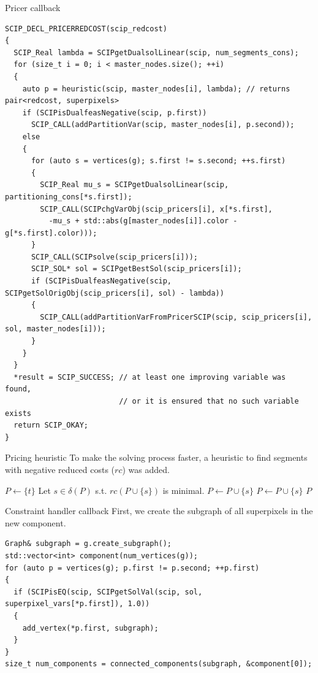 \documentclass[fleqn]{beamer}
\begin{document}
\begin{frame}[fragile]{Pricer callback}
\begin{verbatim}
SCIP_DECL_PRICERREDCOST(scip_redcost)
{
  SCIP_Real lambda = SCIPgetDualsolLinear(scip, num_segments_cons);
  for (size_t i = 0; i < master_nodes.size(); ++i)
  {
    auto p = heuristic(scip, master_nodes[i], lambda); // returns pair<redcost, superpixels>
    if (SCIPisDualfeasNegative(scip, p.first))
      SCIP_CALL(addPartitionVar(scip, master_nodes[i], p.second));
    else
    {
      for (auto s = vertices(g); s.first != s.second; ++s.first)
      {
        SCIP_Real mu_s = SCIPgetDualsolLinear(scip, partitioning_cons[*s.first]);
        SCIP_CALL(SCIPchgVarObj(scip_pricers[i], x[*s.first],
          -mu_s + std::abs(g[master_nodes[i]].color - g[*s.first].color)));
      }
      SCIP_CALL(SCIPsolve(scip_pricers[i]));
      SCIP_SOL* sol = SCIPgetBestSol(scip_pricers[i]);
      if (SCIPisDualfeasNegative(scip, SCIPgetSolOrigObj(scip_pricers[i], sol) - lambda))
      {
        SCIP_CALL(addPartitionVarFromPricerSCIP(scip, scip_pricers[i], sol, master_nodes[i]));
      }
    }
  }
  *result = SCIP_SUCCESS; // at least one improving variable was found,
                          // or it is ensured that no such variable exists
  return SCIP_OKAY;
}
\end{verbatim}
\end{frame}

\begin{frame}{Pricing heuristic}
To make the solving process faster,
a heuristic to find segments with negative reduced costs ($rc$) was added.

\begin{algorithm}[H]
    \caption{Simple pricing heuristic}
    \begin{algorithmic}[1]
        \State $P\gets\{t\}$
        \State Let $s\in\delta(P)$ s.t. $rc(P\cup\{s\})$ is minimal. \label{nextnode}
        \State $P\gets P\cup\{s\}$
        \State {}
        \State $P\gets P\cup\{s\}$
        \State {}
        \Else
        \State \Return $P$
        \EndIf
    \end{algorithmic}
\end{algorithm}
\end{frame}

\begin{frame}[fragile]{Constraint handler callback}
First, we create the subgraph of all superpixels in the new component. 
\begin{verbatim}
Graph& subgraph = g.create_subgraph();
std::vector<int> component(num_vertices(g));
for (auto p = vertices(g); p.first != p.second; ++p.first)
{
  if (SCIPisEQ(scip, SCIPgetSolVal(scip, sol, superpixel_vars[*p.first]), 1.0))
  {
    add_vertex(*p.first, subgraph);
  }
}
size_t num_components = connected_components(subgraph, &component[0]);
 \end{verbatim}
\end{frame}
\end{document}
